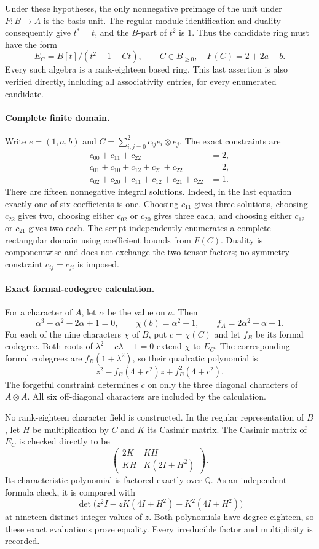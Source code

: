 \documentclass[11pt]{article}
\begin{document}
Under these hypotheses, the only nonnegative preimage of the unit
under $F:B\to A$ is the basis unit. The regular-module identification
and duality consequently give $t^*=t$, and the $B$-part of $t^2$ is
$1$. Thus the candidate ring must have the form
\[
 E_C=B[t]/(t^2-1-Ct),\qquad C\in B_{\geq0},\quad F(C)=2+2a+b.
\]
Every such algebra is a rank-eighteen based ring. This last assertion
is also verified directly, including all associativity entries, for
every enumerated candidate.

\paragraph{Complete finite domain.}
Write $e=(1,a,b)$ and $C=\sum_{i,j=0}^2c_{ij}e_i\otimes e_j$.
The exact constraints are
\begin{align*}
 c_{00}+c_{11}+c_{22}&=2,\\
 c_{01}+c_{10}+c_{12}+c_{21}+c_{22}&=2,\\
 c_{02}+c_{20}+c_{11}+c_{12}+c_{21}+c_{22}&=1.
\end{align*}
There are fifteen nonnegative integral solutions. Indeed, in the last
equation exactly one of six coefficients is one. Choosing $c_{11}$
gives three solutions, choosing $c_{22}$ gives two, choosing either
$c_{02}$ or $c_{20}$ gives three each, and choosing either $c_{12}$ or
$c_{21}$ gives two each. The script independently enumerates a complete
rectangular domain using coefficient bounds from $F(C)$.
Duality is componentwise and does not exchange the two tensor factors;
no symmetry constraint $c_{ij}=c_{ji}$ is imposed.

\paragraph{Exact formal-codegree calculation.}
For a character of $A$, let $\alpha$ be the value on $a$. Then
\[
 \alpha^3-\alpha^2-2\alpha+1=0,\qquad
 \chi(b)=\alpha^2-1,\qquad f_A=2\alpha^2+\alpha+1.
\]
For each of the nine characters $\chi$ of $B$, put
$c=\chi(C)$ and let $f_B$ be its formal codegree. Both roots of
$\lambda^2-c\lambda-1=0$ extend $\chi$ to $E_C$. The corresponding
formal codegrees are $f_B(1+\lambda^2)$, so their quadratic polynomial is
\[
 z^2-f_B(4+c^2)z+f_B^2(4+c^2).
\]
The forgetful constraint determines $c$ on only the three diagonal
characters of $A\otimes A$. All six off-diagonal characters are
included by the calculation.

No rank-eighteen character field is constructed. In the regular
representation of $B$, let $H$ be multiplication by $C$ and $K$ its
Casimir matrix. The Casimir matrix of $E_C$ is checked directly to be
\[
 \begin{pmatrix}2K&KH\\KH&K(2I+H^2)\end{pmatrix}.
\]
Its characteristic polynomial is factored exactly over $\mathbb Q$.
As an independent formula check, it is compared with
\[
 \det\bigl(z^2 I-zK(4I+H^2)+K^2(4I+H^2)\bigr)
\]
at nineteen distinct integer values of $z$. Both polynomials have
degree eighteen, so these exact evaluations prove equality.
Every irreducible factor and multiplicity is recorded.
\end{document}
